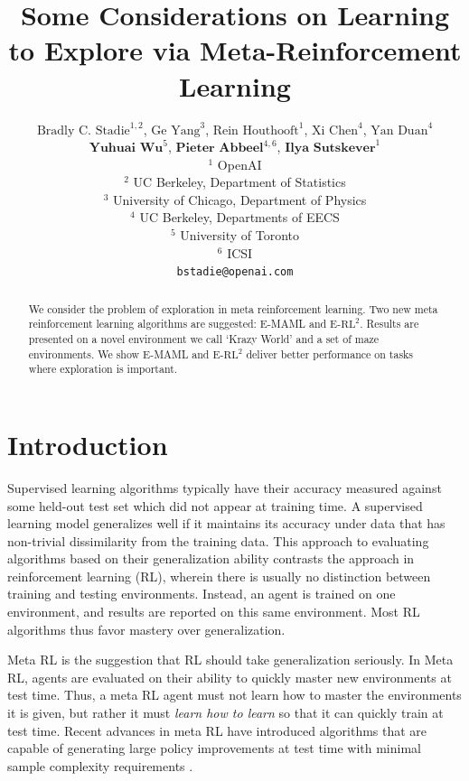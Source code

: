 \documentclass{article} %
\title{Some Considerations on Learning to Explore via Meta-Reinforcement Learning}
\author{$\text{Bradly C. Stadie}^{1, 2}$, $\text{Ge Yang}^{3}$, $\text{Rein Houthooft}^{1}$, $\text{Xi Chen}^{4}$, $\text{Yan Duan}^{4}$ \\$\textbf{Yuhuai Wu}^{5}$, $\textbf{Pieter Abbeel}^{4, 6}$, $\textbf{Ilya Sutskever}^{1}$  \\ 
$^1$ OpenAI\\
$^2$ UC Berkeley, Department of Statistics\\
$^3$ University of Chicago, Department of Physics \\
$^4$ UC Berkeley, Departments of EECS\\
$^5$ University of Toronto \\
$^6$ ICSI \\
\texttt{bstadie@openai.com} \\
}
\begin{document}
\maketitle

\begin{abstract}
We consider the problem of exploration in meta reinforcement learning. Two new meta reinforcement learning algorithms are suggested: E-MAML and E-$\text{RL}^2$. Results are presented on a novel environment we call `Krazy World'  and a set of maze environments. We show E-MAML and E-$\text{RL}^2$ deliver better performance on tasks where exploration is important.
\end{abstract}


\section{Introduction}

Supervised learning algorithms typically have their accuracy measured against some held-out test set which did not appear at training time. A supervised learning model generalizes well if it maintains its accuracy under data that has non-trivial dissimilarity from the training data. This approach to evaluating algorithms based on their generalization ability contrasts the approach in reinforcement learning (RL), wherein there is usually no distinction between training and testing environments. Instead, an agent is trained on one environment, and results are reported on this same environment. Most RL algorithms thus favor mastery over generalization. 

Meta RL is the suggestion that RL should take generalization seriously. In Meta RL, agents are evaluated on their ability to quickly master new environments at test time. Thus, a meta RL agent must not learn how to master the environments it is given, but rather it must \textit{learn how to learn} so that it can quickly train at test time. Recent advances in meta RL have introduced algorithms that are capable of generating large policy improvements at test time with minimal sample complexity requirements \cite{maml, rl2, learntorl}.   
\end{document}
